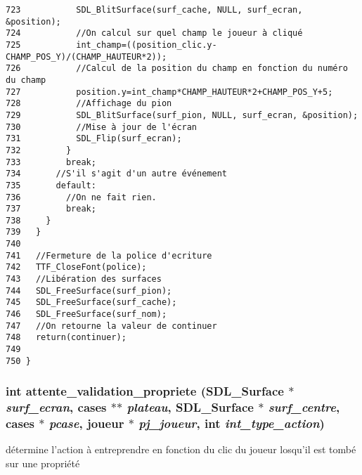 \begin{Code}
\begin{verbatim}
723           SDL_BlitSurface(surf_cache, NULL, surf_ecran, &position);
724           //On calcul sur quel champ le joueur à cliqué
725           int_champ=((position_clic.y-CHAMP_POS_Y)/(CHAMP_HAUTEUR*2));
726           //Calcul de la position du champ en fonction du numéro du champ
727           position.y=int_champ*CHAMP_HAUTEUR*2+CHAMP_POS_Y+5;
728           //Affichage du pion
729           SDL_BlitSurface(surf_pion, NULL, surf_ecran, &position);
730           //Mise à jour de l'écran
731           SDL_Flip(surf_ecran);
732         }
733         break;
734       //S'il s'agit d'un autre événement
735       default:
736         //On ne fait rien.
737         break;
738     }
739   }
740 
741   //Fermeture de la police d'ecriture
742   TTF_CloseFont(police);
743   //Libération des surfaces
744   SDL_FreeSurface(surf_pion);
745   SDL_FreeSurface(surf_cache);
746   SDL_FreeSurface(surf_nom);
747   //On retourne la valeur de continuer
748   return(continuer);
749 
750 }
\end{verbatim}\end{Code}


\subsubsection{\setlength{\rightskip}{0pt plus 5cm}int attente\_\-validation\_\-propriete (SDL\_\-Surface $\ast$ {\em surf\_\-ecran}, {\bf cases} $\ast$$\ast$ {\em plateau}, SDL\_\-Surface $\ast$ {\em surf\_\-centre}, {\bf cases} $\ast$ {\em pcase}, {\bf joueur} $\ast$ {\em pj\_\-joueur}, int {\em int\_\-type\_\-action})}\label{interaction_8h_3bf12a3fb5664e0581318e25e4ec2f58}


d\'{e}termine l'action \`{a} entreprendre en fonction du clic du joueur losqu'il est tomb\'{e} sur une propri\'{e}t\'{e} 

